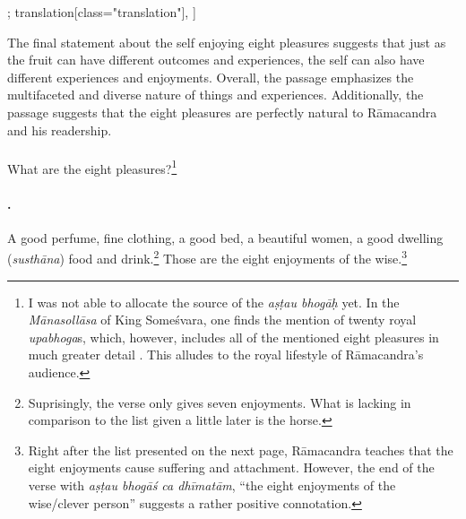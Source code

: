 \begin{alignment}[
  texts=edition[class="edition"];
  translation[class="translation"],
  ]
\begin{translation}
\begin{tlate}
{The final statement about the self enjoying eight pleasures suggests that just as the fruit can have different outcomes and experiences, the self can also have different experiences and enjoyments. Overall, the passage emphasizes the multifaceted and diverse nature of things and experiences. Additionally, the passage suggests that the eight pleasures are perfectly natural to Rāmacandra and his readership.}
\\ \\
What are the eight pleasures?\footnote{I was not able to allocate the source of the \textit{aṣṭau bhogāḥ} yet. In the \textit{Mānasollāsa} of King Someśvara, one finds the mention of twenty royal \textit{upabhoga}s, which, however, includes all of the mentioned eight pleasures in much greater detail \parencite[5]{manasollasa}. This alludes to the royal lifestyle of Rāmacandra's audience.}  \hfill \break
\paragraph{\textsuperscript{}.} A good perfume, fine clothing, a good bed, a beautiful women, a good dwelling (\textit{susthāna}) food and drink.\footnote{Suprisingly, the verse only gives seven enjoyments. What is lacking in comparison to the list given a little later is the horse.} Those are the eight enjoyments of the wise.\footnote{Right after the list presented on the next page, Rāmacandra teaches that the eight enjoyments cause suffering and attachment. However, the end of the verse with \textit{aṣṭau bhogāś ca dhīmatām}, ``the eight enjoyments of the wise/clever person'' suggests a rather positive connotation.}
    \end{tlate}
  \end{translation}
\end{alignment}
